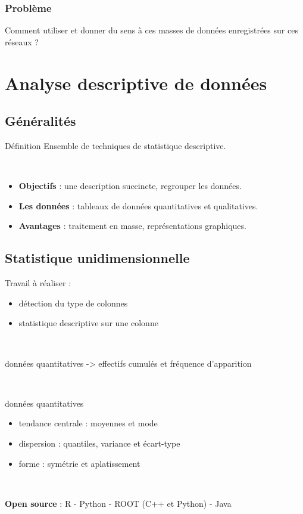 	\begin{frame}
	\frametitle{Problème}
		Comment utiliser et donner du sens à ces masses de données enregistrées sur ces réseaux ?
	\end{frame}
	
	\section{Analyse descriptive de données}
	\subsection{Généralités}
	\begin{frame}
		\begin{block}{Définition}
		Ensemble de techniques de statistique descriptive.
		\end{block}
		~\\
		\begin{itemize}
		\pause\item \textbf{Objectifs} : une description succincte, regrouper les données.
		\pause\item \textbf{Les données} : tableaux de données quantitatives et qualitatives.
		\pause\item \textbf{Avantages} : traitement en masse, représentations graphiques.
		\end{itemize}
	\end{frame}
	
	\subsection{Statistique unidimensionnelle}
	\begin{frame}
		Travail à réaliser :
		\begin{itemize}
		\item détection du type de colonnes 
		\item statistique descriptive sur une colonne
		\end{itemize}
		
		~\\
		\pause
		
		données quantitatives -> effectifs cumulés et fréquence d'apparition
		
		~\\
		\pause
		
		données quantitatives
		\begin{itemize}
		\item tendance centrale : moyennes et mode
		\item dispersion : quantiles, variance et écart-type
		\item forme : symétrie et aplatissement
		\end{itemize}
		
		~\\
		\pause
		
		\textbf{Open source} : R - Python - ROOT (C++ et Python) - Java
		
	\end{frame}
	
